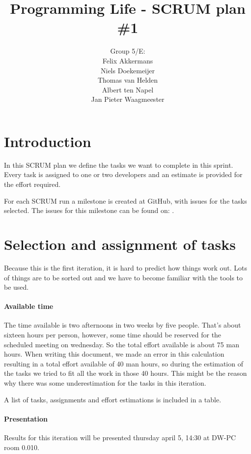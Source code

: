 \documentclass[a4paper]{article}
\title{Programming Life - SCRUM plan \#1}
\author{Group 5/E:\\
Felix Akkermans \\
Niels Doekemeijer \\
Thomas van Helden \\
Albert ten Napel \\
Jan Pieter Waagmeester}
\begin{document}
\maketitle

\section{Introduction}
In this SCRUM plan we define the tasks we want to complete in this sprint. Every task is assigned to one or two developers and an estimate is provided for the effort required.

For each SCRUM run a milestone is created at GitHub, with issues for the tasks selected. The issues for this milestone can be found on: .

\section{Selection and assignment of tasks}
Because this is the first iteration, it is hard to predict how things work out. Lots of things are to be sorted out and we have to become familiar with the tools to be used.

\paragraph{Available time}
The time available is two afternoons in two weeks by five people. That's about sixteen hours per person, however, some time should be reserved for the scheduled meeting on wednesday. So the total effort available is about 75 man hours. When writing this document, we made an error in this calculation resulting in a total effort available of 40 man hours, so during the estimation of the tasks we tried to fit all the work in those 40 hours. This might be the reason why there was some underestimation for the tasks in this iteration.

A list of tasks, assignments and effort estimations is included in a table.


\paragraph{Presentation}
Results for this iteration will be presented thursday april 5, 14:30 at DW-PC room 0.010.
\end{document}
